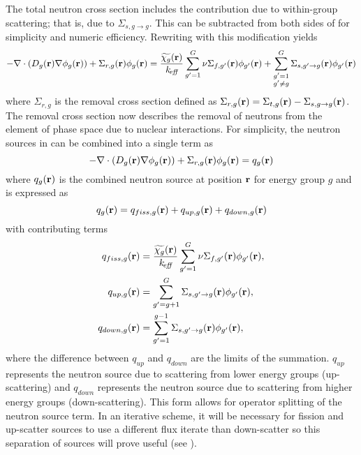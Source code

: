   The total neutron cross section includes the contribution due to within-group
  scattering; that is, due to $\Sigma_{s,g\rightarrow g}$. This can be
  subtracted from both sides of  for simplicity
  and numeric efficiency. Rewriting  with this
  modification yields
  \begin{equation} 
    \label{eq:multigroup_removal}
    - \mathbf{\nabla} \cdot( D_g(\mathbf{r}) \mathbf{\nabla} \phi_g(\mathbf{r})) + \Sigma_{r,g}(\mathbf{r}) \phi_g(\mathbf{r}) = 
      \frac{\widetilde{\chi_g}(\mathbf{r})}{k_{\!\mbox{\scriptsize \em eff}}} 
      \sum_{g'=1}^{G} \nu\Sigma_{f,g'}(\mathbf{r}) 
      \phi_{g'}(\mathbf{r}) + \sum_{\substack{g'=1 \\ g' \ne g}}^{G} 
      \Sigma_{s,g' \rightarrow g}(\mathbf{r}) \phi_{g'}(\mathbf{r})
  \end{equation}
  where $\Sigma_{r,g}$ is the removal cross section defined as
  $\Sigma_{r,g}(\mathbf{r}) = \Sigma_{t,g}(\mathbf{r}) - \Sigma_{s,g\rightarrow g}(\mathbf{r})$. The
  removal cross section now describes the removal of neutrons from the element
  of phase space due to nuclear interactions.  For simplicity, the neutron
  sources in  can be combined into a single term as
  \begin{equation}
    \label{eq:multigroup_source}
    - \mathbf{\nabla} \cdot( D_g(\mathbf{r}) \mathbf{\nabla} \phi_g(\mathbf{r})) + \Sigma_{r,g}(\mathbf{r}) \phi_g(\mathbf{r}) = 
      q_g(\mathbf{r})
  \end{equation}
  where $q_g(\mathbf{r})$ is the combined neutron source at position $\mathbf{r}$ for energy
  group $g$ and is expressed as
  \begin{equation}
    \label{eq:q}
    q_g(\mathbf{r}) = q_{fiss,g}(\mathbf{r}) + q_{up,g}(\mathbf{r}) + q_{down,g}(\mathbf{r}) 
  \end{equation}
  with contributing terms
  \begin{align}
    \label{eq:qfiss}
    q_{fiss,g}(\mathbf{r}) &= \frac{\widetilde{\chi_g}(\mathbf{r})}{k_{\!\mbox{\scriptsize \em eff}}} \sum_{g'=1}^{G} 
      \nu \Sigma_{f,g'}(\mathbf{r}) \phi_{g'}(\mathbf{r}), \\
    \label{eq:qup}
    q_{up,g}(\mathbf{r}) &= \sum_{g'=g+1}^{G} \Sigma_{s,g' \rightarrow g}(\mathbf{r})
      \phi_{g'}(\mathbf{r}), \\
    \label{eq:qdown}
    q_{down,g}(\mathbf{r}) &= \sum_{g'=1}^{g-1} \Sigma_{s,g' \rightarrow g}(\mathbf{r})
      \phi_{g'}(\mathbf{r}),
  \end{align}
  where the difference between $q_{up}$ and $q_{down}$ are the limits of the
  summation. $q_{up}$ represents the neutron source due to scattering from lower
  energy groups (up-scattering) and $q_{down}$ represents the neutron source due
  to scattering from higher energy groups (down-scattering). This form allows
  for operator splitting of the neutron source term. In an iterative scheme, it
  will be necessary for fission and up-scatter sources to use a different flux
  iterate than down-scatter so this separation of sources will prove useful (see
  ).


